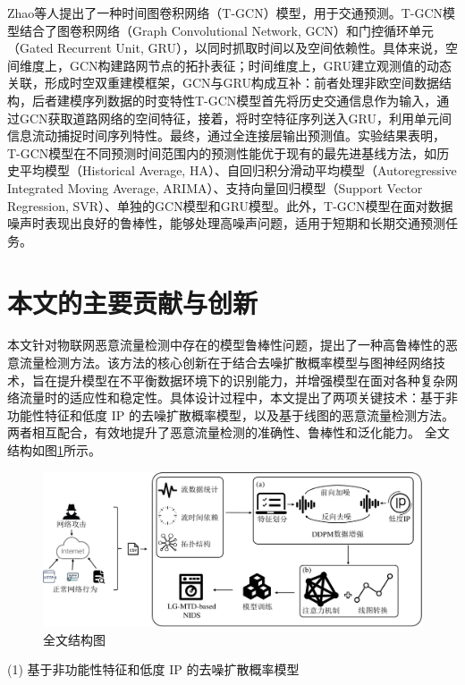 \documentclass[promaster]{thesis-uestc}
\begin{document}
Zhao等人提出了一种时间图卷积网络（T-GCN）模型，用于交通预测。T-GCN模型结合了图卷积网络（Graph Convolutional Network, GCN）和门控循环单元（Gated Recurrent Unit, GRU），以同时抓取时间以及空间依赖性。具体来说，空间维度上，GCN构建路网节点的拓扑表征；时间维度上，GRU建立观测值的动态关联，形成时空双重建模框架，GCN与GRU构成互补：前者处理非欧空间数据结构，后者建模序列数据的时变特性T-GCN模型首先将历史交通信息作为输入，通过GCN获取道路网络的空间特征，接着，将时空特征序列送入GRU，利用单元间信息流动捕捉时间序列特性。最终，通过全连接层输出预测值。实验结果表明，T-GCN模型在不同预测时间范围内的预测性能优于现有的最先进基线方法，如历史平均模型（Historical Average, HA）、自回归积分滑动平均模型（Autoregressive Integrated Moving Average, ARIMA）、支持向量回归模型（Support Vector Regression, SVR）、单独的GCN模型和GRU模型。此外，T-GCN模型在面对数据噪声时表现出良好的鲁棒性，能够处理高噪声问题，适用于短期和长期交通预测任务。



\section{本文的主要贡献与创新}


本文针对物联网恶意流量检测中存在的模型鲁棒性问题，提出了一种高鲁棒性的恶意流量检测方法。该方法的核心创新在于结合去噪扩散概率模型与图神经网络技术，旨在提升模型在不平衡数据环境下的识别能力，并增强模型在面对各种复杂网络流量时的适应性和稳定性。具体设计过程中，本文提出了两项关键技术：基于非功能性特征和低度 IP 的去噪扩散概率模型，以及基于线图的恶意流量检测方法。两者相互配合，有效地提升了恶意流量检测的准确性、鲁棒性和泛化能力。
全文结构如图\ref{fig:full-process}所示。
\begin{figure}[h!]
    \centering
    \includegraphics[width=1\linewidth]{./pic/full-process.pdf}
    \caption{全文结构图}
    \label{fig:full-process}
\end{figure}

(1) 基于非功能性特征和低度 IP 的去噪扩散概率模型  
\end{document}
